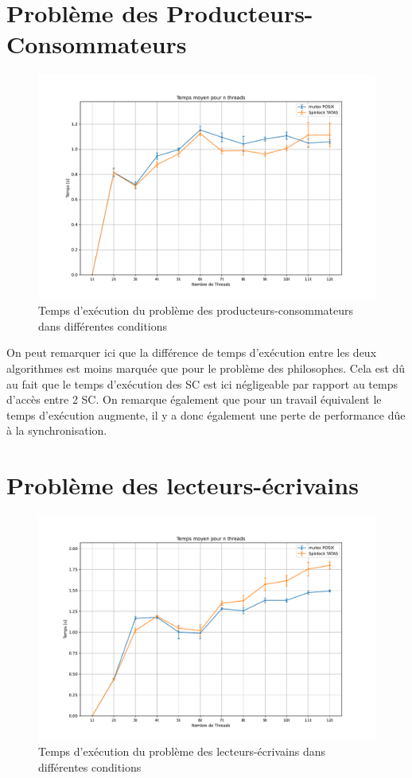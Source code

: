 \section{Problème des Producteurs-Consommateurs}

\begin{figure}[h!]
    \centering
    \includegraphics[scale=0.45]{img/prodcons.pdf}
    \caption{Temps d'exécution du problème des producteurs-consommateurs dans différentes conditions}
    \label{pic:prodcons}
\end{figure}

\noindent On peut remarquer ici que la différence de temps d'exécution entre les deux algorithmes est moins marquée que pour le problème des philosophes. Cela est dû au fait que 
le temps d'exécution des SC est ici négligeable par rapport au temps d'accès entre 2 SC. 
On remarque également que pour un travail équivalent le temps d'exécution augmente, il y a donc également une perte de performance dûe à la synchronisation.

\section{Problème des lecteurs-écrivains}

\begin{figure}[h!]
    \centering
    \includegraphics[scale=0.45]{img/readwrt.pdf}
    \caption{Temps d'exécution du problème des lecteurs-écrivains dans différentes conditions}
    \label{pic:readwrt}
\end{figure}

